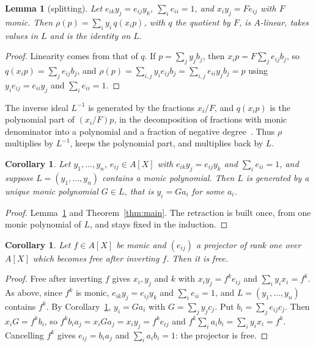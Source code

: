 \documentclass[11pt]{amsart}
\newtheorem{lemma}[theorem]{Lemma}
\newtheorem{corollary}[theorem]{Corollary}
\theoremstyle{remark}
\begin{document}
\begin{lemma}[splitting]\label{lem:split}
Let $e_{ik}y_j=e_{ij}y_k$, $\sum_ie_{ii}=1$, and $x_iy_j=Fe_{ij}$ with $F$
monic. Then $\rho(p)=\sum_i y_i\,q(x_ip)$, with $q$ the quotient by $F$, is
$A$-linear, takes values in $L$ and is the identity on $L$.
\end{lemma}

\begin{proof}
Linearity comes from that of $q$. If $p=\sum_jy_jb_j$, then
$x_ip=F\sum_je_{ij}b_j$, so $q(x_ip)=\sum_je_{ij}b_j$, and
$\rho(p)=\sum_{i,j}y_ie_{ij}b_j=\sum_{i,j}e_{ii}y_jb_j=p$ using
$y_ie_{ij}=e_{ii}y_j$ and $\sum_ie_{ii}=1$.
\end{proof}

The inverse ideal $L^{-1}$ is generated by the fractions $x_i/F$, and
$q(x_ip)$ is the polynomial part of $(x_i/F)p$, in the decomposition of
fractions with monic denominator into a polynomial and a fraction of
negative degree~\cite[Prop.~IV.1.4]{Lam}. Thus $\rho$ multiplies by
$L^{-1}$, keeps the polynomial part, and multiplies back by $L$.

\begin{corollary}\label{cor:rankone}
Let $y_1,\dots,y_n$, $e_{ij}\in A[X]$ with $e_{ik}y_j=e_{ij}y_k$ and
$\sum_ie_{ii}=1$, and suppose $L=(y_1,\dots,y_n)$ contains a monic
polynomial. Then $L$ is generated by a unique monic polynomial $G\in L$,
that is $y_i=Ga_i$ for some $a_i$.
\end{corollary}

\begin{proof}
Lemma~\ref{lem:split} and Theorem~\ref{thm:main}. The retraction is built
once, from one monic polynomial of $L$, and stays fixed in the induction.
\end{proof}

\begin{corollary}
Let $f\in A[X]$ be monic and $(e_{ij})$ a projector of rank one over $A[X]$
which becomes free after inverting $f$. Then it is free.
\end{corollary}

\begin{proof}
Free after inverting $f$ gives $x_i,y_j$ and $k$ with $x_iy_j=f^ke_{ij}$ and
$\sum_iy_ix_i=f^k$. As above, since $f^k$ is monic, $e_{ik}y_j=e_{ij}y_k$
and $\sum_ie_{ii}=1$, and $L=(y_1,\dots,y_n)$ contains $f^k$. By
Corollary~\ref{cor:rankone}, $y_i=Ga_i$ with $G=\sum_jy_jc_j$. Put
$b_i=\sum_je_{ij}c_j$. Then $x_iG=f^kb_i$, so
$f^kb_ia_j=x_iGa_j=x_iy_j=f^ke_{ij}$ and $f^k\sum_ia_ib_i=\sum_iy_ix_i=f^k$.
Cancelling $f^k$ gives $e_{ij}=b_ia_j$ and $\sum_ia_ib_i=1$: the projector
is free.
\end{proof}
\end{document}
